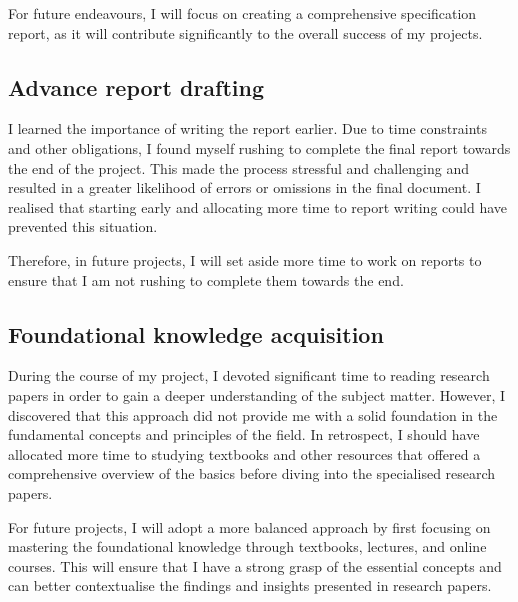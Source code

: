 For future endeavours, I will focus on creating a comprehensive specification report, as it will contribute significantly to the overall success of my projects.

\subsection{Advance report drafting}

I learned the importance of writing the report earlier. Due to time constraints and other obligations, I found myself rushing to complete the final report towards the end of the project. This made the process stressful and challenging and resulted in a greater likelihood of errors or omissions in the final document. I realised that starting early and allocating more time to report writing could have prevented this situation.

Therefore, in future projects, I will set aside more time to work on reports to ensure that I am not rushing to complete them towards the end.

\subsection{Foundational knowledge acquisition}

During the course of my project, I devoted significant time to reading research papers in order to gain a deeper understanding of the subject matter. However, I discovered that this approach did not provide me with a solid foundation in the fundamental concepts and principles of the field. In retrospect, I should have allocated more time to studying textbooks and other resources that offered a comprehensive overview of the basics before diving into the specialised research papers.

For future projects, I will adopt a more balanced approach by first focusing on mastering the foundational knowledge through textbooks, lectures, and online courses. This will ensure that I have a strong grasp of the essential concepts and can better contextualise the findings and insights presented in research papers.
